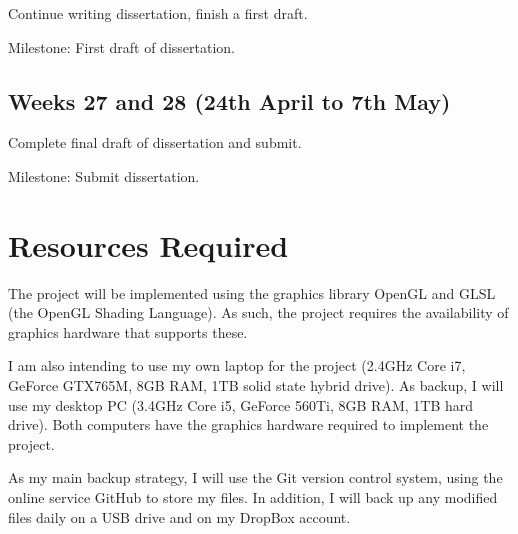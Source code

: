 \documentclass[12pt]{article}
\begin{document}
Continue writing dissertation, finish a first draft.

Milestone: First draft of dissertation.

\subsection*{Weeks 27 and 28 (24th April to 7th May)}

Complete final draft of dissertation and submit.

Milestone: Submit dissertation.

\section*{Resources Required}

The project will be implemented using the graphics library OpenGL and GLSL (the OpenGL Shading Language). As such, the project requires the availability of graphics hardware that supports these.

I am also intending to use my own laptop for the project (2.4GHz Core i7, GeForce GTX765M, 8GB RAM, 1TB solid state hybrid drive). As backup, I will use my desktop PC (3.4GHz Core i5, GeForce 560Ti, 8GB RAM, 1TB hard drive). Both computers have the graphics hardware required to implement the project.

As my main backup strategy, I will use the Git version control system, using the online service GitHub to store my files. In addition, I will back up any modified files daily on a USB drive and on my DropBox account.
\end{document}
